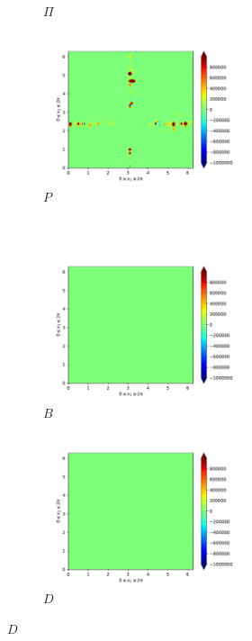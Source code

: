 \begin{figure}[H]
\begin{subfigure}{0.45\textwidth}
        \caption{$\Pi$}
    \end{subfigure}
    \newline
    \begin{subfigure}{0.45\textwidth}
        \includegraphics[height=1.75in]{media/run-cds-65/prod-enst-CDS-65}
        \caption{$P$}
    \end{subfigure}
    ~
    \begin{subfigure}{0.45\textwidth}
        \includegraphics[height=1.75in]{media/run-cds-65/B-enst-CDS-65}
        \caption{$B$}
    \end{subfigure}
    \newline
    \begin{subfigure}{0.45\textwidth}
        \includegraphics[height=1.75in]{media/run-cds-65/D-enst-CDS-65}
        \caption{$D$}
    \end{subfigure}
\end{figure}
